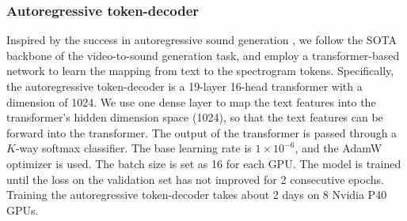\documentclass[lettersize,journal]{IEEEtran}
\begin{document}
\subsubsection{Autoregressive token-decoder} Inspired by the success in autoregressive sound generation \cite{iashin2021taming,liu2021conditional}, we follow the SOTA backbone of the video-to-sound generation task, and employ a transformer-based network to learn the mapping from text to the spectrogram tokens. Specifically, the autoregressive token-decoder is a 19-layer 16-head transformer with a dimension of 1024. We use one dense layer to map the text features into the transformer’s hidden dimension space (1024), so that the text features can be forward into the transformer. The output of the transformer is passed through a $K$-way softmax classifier. The base learning rate is $1 \times 10^{-6}$, and the AdamW optimizer \cite{loshchilov2017decoupled} is used. The batch size is set as 16 for each GPU. The model is trained until the loss on the validation set has not improved for 2 consecutive epochs. Training the autoregressive token-decoder takes about 2 days on 8 Nvidia P40 GPUs. 
\end{document}
